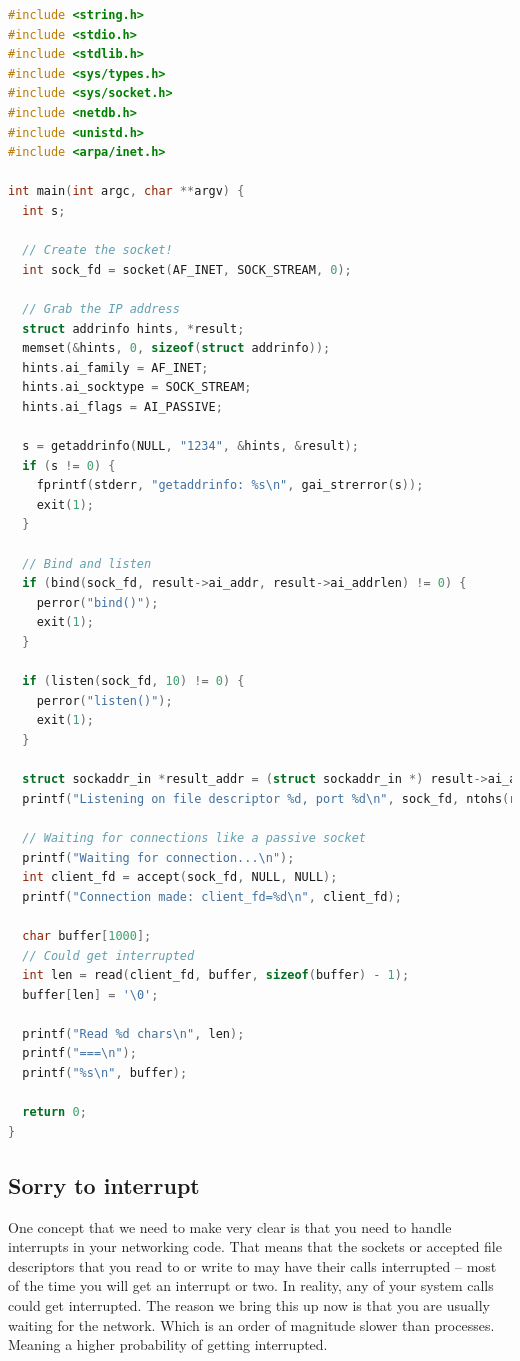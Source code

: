 \begin{lstlisting}[language=C]
#include <string.h>
#include <stdio.h>
#include <stdlib.h>
#include <sys/types.h>
#include <sys/socket.h>
#include <netdb.h>
#include <unistd.h>
#include <arpa/inet.h>

int main(int argc, char **argv) {
  int s;

  // Create the socket!
  int sock_fd = socket(AF_INET, SOCK_STREAM, 0);

  // Grab the IP address
  struct addrinfo hints, *result;
  memset(&hints, 0, sizeof(struct addrinfo));
  hints.ai_family = AF_INET;
  hints.ai_socktype = SOCK_STREAM;
  hints.ai_flags = AI_PASSIVE;

  s = getaddrinfo(NULL, "1234", &hints, &result);
  if (s != 0) {
    fprintf(stderr, "getaddrinfo: %s\n", gai_strerror(s));
    exit(1);
  }

  // Bind and listen
  if (bind(sock_fd, result->ai_addr, result->ai_addrlen) != 0) {
    perror("bind()");
    exit(1);
  }

  if (listen(sock_fd, 10) != 0) {
    perror("listen()");
    exit(1);
  }

  struct sockaddr_in *result_addr = (struct sockaddr_in *) result->ai_addr;
  printf("Listening on file descriptor %d, port %d\n", sock_fd, ntohs(result_addr->sin_port));

  // Waiting for connections like a passive socket
  printf("Waiting for connection...\n");
  int client_fd = accept(sock_fd, NULL, NULL);
  printf("Connection made: client_fd=%d\n", client_fd);

  char buffer[1000];
  // Could get interrupted
  int len = read(client_fd, buffer, sizeof(buffer) - 1);
  buffer[len] = '\0';

  printf("Read %d chars\n", len);
  printf("===\n");
  printf("%s\n", buffer);

  return 0;
}
\end{lstlisting}

\subsection{Sorry to interrupt}

One concept that we need to make very clear is that you need to handle interrupts in your networking code.
That means that the sockets or accepted file descriptors that you read to or write to may have their calls interrupted -- most of the time you will get an interrupt or two.
In reality, any of your system calls could get interrupted.
The reason we bring this up now is that you are usually waiting for the network.
Which is an order of magnitude slower than processes.
Meaning a higher probability of getting interrupted.

